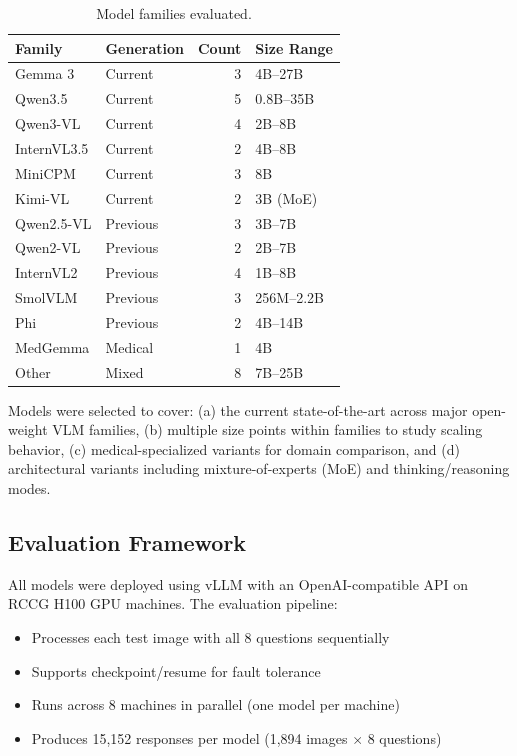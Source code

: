 \documentclass[11pt,a4paper]{article}
\begin{document}
\begin{table}[H]
\centering
\caption{Model families evaluated.}
\label{tab:families}
\begin{tabular}{llrl}
\toprule
\textbf{Family} & \textbf{Generation} & \textbf{Count} & \textbf{Size Range} \\
\midrule
Gemma 3 & Current & 3 & 4B--27B \\
Qwen3.5 & Current & 5 & 0.8B--35B \\
Qwen3-VL & Current & 4 & 2B--8B \\
InternVL3.5 & Current & 2 & 4B--8B \\
MiniCPM & Current & 3 & 8B \\
Kimi-VL & Current & 2 & 3B (MoE) \\
Qwen2.5-VL & Previous & 3 & 3B--7B \\
Qwen2-VL & Previous & 2 & 2B--7B \\
InternVL2 & Previous & 4 & 1B--8B \\
SmolVLM & Previous & 3 & 256M--2.2B \\
Phi & Previous & 2 & 4B--14B \\
MedGemma & Medical & 1 & 4B \\
Other & Mixed & 8 & 7B--25B \\
\bottomrule
\end{tabular}
\end{table}

Models were selected to cover: (a) the current state-of-the-art across major open-weight VLM families, (b) multiple size points within families to study scaling behavior, (c) medical-specialized variants for domain comparison, and (d) architectural variants including mixture-of-experts (MoE) and thinking/reasoning modes.

\subsection{Evaluation Framework}

All models were deployed using vLLM with an OpenAI-compatible API on RCCG H100 GPU machines. The evaluation pipeline:

\begin{itemize}
    \item Processes each test image with all 8 questions sequentially
    \item Supports checkpoint/resume for fault tolerance
    \item Runs across 8 machines in parallel (one model per machine)
    \item Produces 15,152 responses per model (1,894 images $\times$ 8 questions)
\end{itemize}
\end{document}
